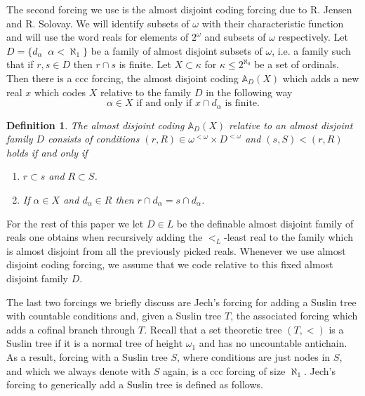 \documentclass[a4paper,12pt]{article}
\newtheorem{definition}[theorem]{Definition}
\begin{document}
The second forcing we use is the almost disjoint coding forcing due to R. Jensen and R. Solovay. We will identify subsets of $\omega$ with their characteristic function and will use the word reals for elements of $2^{\omega}$ and subsets of $\omega$ respectively.
Let $D=\{d_{\alpha} \, \: \, \alpha < \aleph_1 \}$ be a family of almost disjoint subsets of $\omega$, i.e. a family such that if $r, s \in D$ then 
$r \cap s$ is finite. Let $X\subset  \kappa$ for $\kappa \le 2^{\aleph_0}$ be a set of ordinals. Then there 
is a ccc forcing, the almost disjoint coding $\mathbb{A}_D(X)$ which adds 
a new real $x$ which codes $X$ relative to the family $D$ in the following way
$$\alpha \in X \text{ if and only if } x \cap d_{\alpha} \text{ is finite.}$$
\begin{definition}
 The almost disjoint coding $\mathbb{A}_D(X)$ relative to an almost disjoint family $D$ consists of
 conditions $(r, R) \in \omega^{<\omega} \times D^{<\omega}$ and
 $(s,S) < (r,R)$ holds if and only if
 \begin{enumerate}
  \item $r \subset s$ and $R \subset S$.
  \item If $\alpha \in X$ and $d_{\alpha} \in R$ then $r \cap d_{\alpha} = s \cap d_{\alpha}$.
 \end{enumerate}
\end{definition}
For the rest of this paper we let $D \in L$ be the definable almost disjoint family of reals one obtains when recursively adding the $<_L$-least real to the family which is almost disjoint from all the previously picked reals. 
Whenever we use almost disjoint coding forcing, we assume that we code relative to this fixed almost disjoint family $D$.

The last two forcings we briefly discuss are Jech's forcing for adding a Suslin tree with countable conditions and, given a Suslin tree $T$, the associated forcing which adds a cofinal branch through $T$. 
Recall that a set theoretic tree $(T, <)$ is a Suslin tree if it is a normal tree of height $\omega_1$
and has no uncountable antichain. As a result, forcing with a Suslin tree $S$, where conditions are just nodes in $S$, and which we always denote with $S$ again, is a ccc forcing of size $\aleph_1$. 
Jech's forcing to generically add a Suslin tree is defined as follows.
\end{document}
